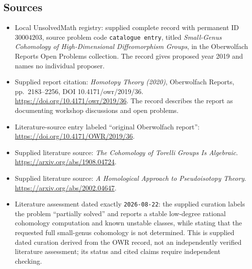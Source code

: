 \documentclass[11pt]{article}
\begin{document}
\subsection{Sources}
\begin{itemize}
\item Local UnsolvedMath registry: supplied complete record with permanent ID \(30004203\), source problem code \texttt{catalogue entry}, titled \emph{Small-Genus Cohomology of High-Dimensional Diffeomorphism Groups}, in the Oberwolfach Reports Open Problems collection. The record gives proposed year 2019 and names no individual proposer.
\item Supplied report citation: \emph{Homotopy Theory (2020)}, Oberwolfach Reports, pp.\ 2183--2256, DOI 10.4171/owr/2019/36. \url{https://doi.org/10.4171/owr/2019/36}. The record describes the report as documenting workshop discussions and open problems.
\item Literature-source entry labeled ``original Oberwolfach report'': \url{https://doi.org/10.4171/OWR/2019/36}.
\item Supplied literature source: \emph{The Cohomology of Torelli Groups Is Algebraic}. \url{https://arxiv.org/abs/1908.04724}.
\item Supplied literature source: \emph{A Homological Approach to Pseudoisotopy Theory}. \url{https://arxiv.org/abs/2002.04647}.
\item Literature assessment dated exactly \texttt{2026-08-22}: the supplied curation labels the problem ``partially solved'' and reports a stable low-degree rational cohomology computation and known unstable classes, while stating that the requested full small-genus cohomology is not determined. This is supplied dated curation derived from the OWR record, not an independently verified literature assessment; its status and cited claims require independent checking.
\end{itemize}
\end{document}
